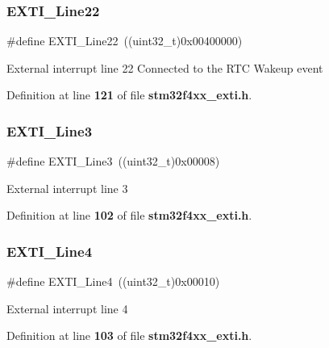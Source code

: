 \mbox{\label{group__EXTI__Lines_gabc65f8a90a3d5595896505ef2c59bec6}} 
\subsubsection{E\+X\+T\+I\+\_\+\+Line22}
{\footnotesize\ttfamily \#define E\+X\+T\+I\+\_\+\+Line22~((uint32\+\_\+t)0x00400000)}

External interrupt line 22 Connected to the R\+TC Wakeup event 

Definition at line \textbf{ 121} of file \textbf{ stm32f4xx\+\_\+exti.\+h}.

\mbox{\label{group__EXTI__Lines_gadea3ef6ab7e8bacc686689de8711b98c}} 
\subsubsection{E\+X\+T\+I\+\_\+\+Line3}
{\footnotesize\ttfamily \#define E\+X\+T\+I\+\_\+\+Line3~((uint32\+\_\+t)0x00008)}

External interrupt line 3 

Definition at line \textbf{ 102} of file \textbf{ stm32f4xx\+\_\+exti.\+h}.

\mbox{\label{group__EXTI__Lines_gab33b1fe19306e9e60f8f8d0928b800be}} 
\subsubsection{E\+X\+T\+I\+\_\+\+Line4}
{\footnotesize\ttfamily \#define E\+X\+T\+I\+\_\+\+Line4~((uint32\+\_\+t)0x00010)}

External interrupt line 4 

Definition at line \textbf{ 103} of file \textbf{ stm32f4xx\+\_\+exti.\+h}.

\mbox{\label{group__EXTI__Lines_ga6b4c6292e3abd521cab2bf99d37a15c6}} 
